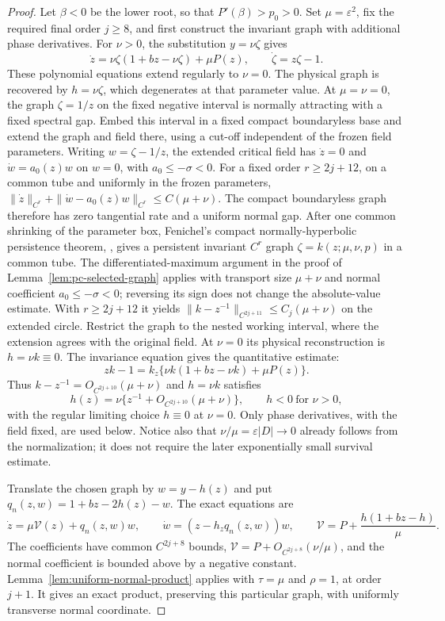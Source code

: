 \begin{proof}
Let $\beta<0$ be the lower root, so that $P'(\beta)>p_0>0$.
Set $\mu=\varepsilon^2$, fix the required final order $j\ge8$, and
first construct the invariant graph with additional phase derivatives.
For $\nu>0$, the substitution $y=\nu\zeta$ gives
\[
 \dot z=\nu\zeta(1+bz-\nu\zeta)+\mu P(z),\qquad
 \dot\zeta=z\zeta-1.
\]
These polynomial equations extend regularly to $\nu=0$.
The physical graph is recovered by $h=\nu\zeta$, which degenerates at
that parameter value.
At $\mu=\nu=0$, the graph $\zeta=1/z$ on the fixed negative
interval is normally attracting with a fixed spectral gap. Embed this
interval in a fixed compact boundaryless base and extend the graph and
field there, using a cut-off independent of the frozen field parameters.
Writing $w=\zeta-1/z$, the extended critical field has
$\dot z=0$ and $\dot w=a_0(z)w$ on $w=0$, with
$a_0\le-\sigma<0$. For a fixed order $r\ge 2j+12$, on a common tube
and uniformly in the frozen parameters,
$\|\dot z\|_{C^r}+\|\dot w-a_0(z)w\|_{C^r}\le C(\mu+\nu)$.
The compact boundaryless graph therefore has zero tangential rate and a
uniform normal gap. After one common shrinking of the parameter box,
Fenichel's compact normally-hyperbolic persistence theorem,
\cite[Theorem~3, p.~215]{Fenichel1971}, gives a persistent invariant
$C^r$ graph $\zeta=k(z;\mu,\nu,p)$ in a common tube.
The differentiated-maximum argument in the proof of
Lemma~\ref{lem:pc-selected-graph} applies with transport size
$\mu+\nu$ and normal coefficient $a_0\le-\sigma<0$; reversing its
sign does not change the absolute-value estimate. With
$r\ge2j+12$ it yields
$\|k-z^{-1}\|_{C^{2j+11}}\le C_j(\mu+\nu)$ on the extended circle.
Restrict the graph to
the nested working interval, where the extension agrees with the original
field. At $\nu=0$ its physical reconstruction is $h=\nu k\equiv0$.
The invariance equation gives the quantitative estimate:
\[
 zk-1=k_z\{\nu k(1+bz-\nu k)+\mu P(z)\}.
\]
Thus $k-z^{-1}=O_{C^{2j+10}}(\mu+\nu)$ and $h=\nu k$ satisfies
\begin{equation}\label{eq:lower-slow-graph}
 h(z)=\nu\{z^{-1}+O_{C^{2j+10}}(\mu+\nu)\},
 \qquad h<0\ \text{for }\nu>0,
\end{equation}
with the regular limiting choice $h\equiv0$ at $\nu=0$. Only phase derivatives, with the field fixed,
are used below. Notice also that $\nu/\mu=\varepsilon|D|\to0$
already follows from the normalization; it does not require the later
exponentially small survival estimate.

Translate the chosen graph by $w=y-h(z)$ and put
$q_n(z,w)=1+bz-2h(z)-w$. The exact equations are
\[
 \dot z=\mu\mathcal V(z)+q_n(z,w)w,\qquad
 \dot w=(z-h_zq_n(z,w))w,\qquad
 \mathcal V=P+\frac{h(1+bz-h)}\mu.
\]
The coefficients have common $C^{2j+8}$ bounds,
$\mathcal V=P+O_{C^{2j+8}}(\nu/\mu)$,
and the normal coefficient is bounded above by a negative constant.
Lemma~\ref{lem:uniform-normal-product} applies with $\tau=\mu$ and
$\rho=1$, at order $j+1$. It gives an exact product, preserving this particular graph,
with uniformly transverse normal coordinate.


\end{proof}
